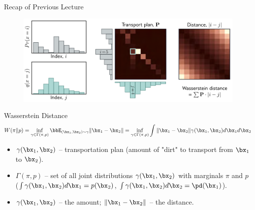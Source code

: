 \documentclass{beamer}
\begin{document}
\begin{frame}{Recap of Previous Lecture}
	\begin{figure}
		\centering
		\includegraphics[width=0.8\linewidth]{figs/discrete_wasserstein}
	\end{figure}
	\vspace{-0.3cm}
	\begin{block}{Wasserstein Distance}
		\vspace{-0.7cm}
		{\small
		\[
		W(\pi \| p) = \inf_{\gamma \in \Gamma(\pi, p)} \bbE_{(\bx_1, \bx_2) \sim \gamma} \| \bx_1 - \bx_2 \| =  \inf_{\gamma \in \Gamma(\pi, p)} \int \| \bx_1 - \bx_2 \| \gamma (\bx_1, \bx_2) d \bx_1 d \bx_2
		\]
		}
		\vspace{-0.5cm}
		\begin{itemize}
			\item $\gamma(\bx_1, \bx_2)$ -- transportation plan (amount of "dirt" to transport from $\bx_1$ to $\bx_2$).
			\item $\Gamma(\pi, p)$ -- set of all joint distributions $\gamma (\bx_1, \bx_2)$ with marginals $\pi$ and $p$ ($\int \gamma(\bx_1, \bx_2) d \bx_1 = p(\bx_2)$, $\int \gamma(\bx_1, \bx_2) d \bx_2 = \pd(\bx_1)$).
			\item $\gamma(\bx_1, \bx_2)$ -- the amount; $\|\bx_1 - \bx_2 \|$ -- the distance.
		\end{itemize}
	\end{block}
\end{frame}
\end{document}
